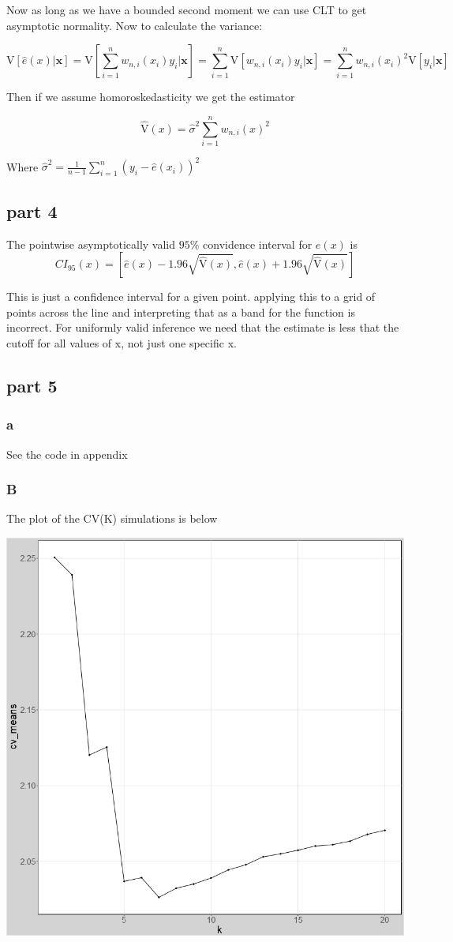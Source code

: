 \documentclass[11pt]{article}
\newcommand{\V}{\mathrm{V}}
\begin{document}
Now as long as we have a bounded second moment we can use CLT to get asymptotic normality. Now to calculate the variance:

$$ \V[\hat{e}(x)|\bm{x}] = \V \left[ \sum_{i=1}^{n} w_{n,i}(x_i)y_i |\bm{x}  \right] =  \sum_{i=1}^{n} \V \left[ w_{n,i}(x_i)y_i |\bm{x}  \right] = \sum_{i=1}^{n} w_{n,i}(x_i)^2 \V \left[y_i |\bm{x}  \right]
$$

Then if we assume homoroskedasticity we get the estimator

$$\hat{\V}(x) = \hat{\sigma}^2 \sum_{i=1}^{n}w_{n,i}(x)^2$$

	
Where 
$\hat{\sigma}^2 = \frac{1}{n-1} \sum_{i=1}^{n} (y_i - \hat{e}(x_i))^2$

\subsection{part 4}

The pointwise asymptotically valid $95\% $ convidence interval for $e(x)$ is 
$$CI_{95}(x) = [\hat{e}(x) - 1.96 \sqrt{\hat{\V}(x)}, \hat{e}(x) + 1.96 \sqrt{\hat{\V}(x)}] $$

This is just a confidence interval for a given point. applying this to a grid of points across the line and interpreting that as a band for the function is incorrect. For uniformly valid inference we need that the estimate is less that the cutoff for all values of x, not just one specific x. 

\subsection{part 5}
\subsubsection{a}
See the code in appendix 

\subsubsection{B} 
The plot of the CV(K) simulations is below 
\begin{center}
	\includegraphics[width=.6\linewidth]{plot_2_5_b.png}
	
\end{center}
\end{document}
